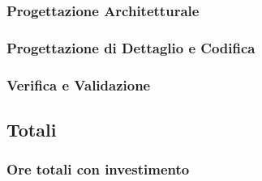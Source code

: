 		\subsubsection{Progettazione Architetturale}
		\subsubsection{Progettazione di Dettaglio e Codifica}
		\subsubsection{Verifica e Validazione}

	\subsection{Totali}
		\subsubsection{Ore totali con investimento}	